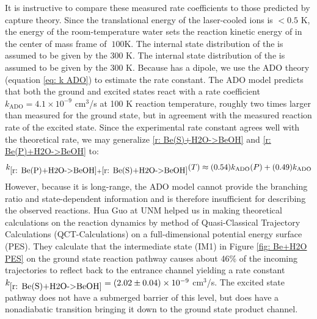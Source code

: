 It is instructive to compare these measured rate coefficients to those predicted by capture theory. Since the translational energy of the laser-cooled  ions is $<0.5$ K, the energy of the room-temperature water sets the reaction kinetic energy of  in the center of mass frame of $~100$K. The internal state distribution of the  is assumed to be given by the 300 K. The internal state distribution of the  is assumed to be given by the 300 K. Because  has a dipole, we use the ADO theory (equation \ref{eq: k ADO}) to estimate the rate constant. The ADO model predicts that both the ground and excited  states react with a rate coefficient $k_{\text{ADO}} = 4.1 \times 10^{-9}$ cm$^3$/s at 100 K reaction temperature, roughly two times larger than measured for the ground state, but in agreement with the measured reaction rate of the excited state. Since the experimental rate constant agrees well with the theoretical rate, we may generalize \ref{r: Be(S)+H2O->BeOH} and \ref{r: Be(P)+H2O->BeOH} to:
\begin{equation}
	k_{\ref{r: Be(P)+H2O->BeOH}+\ref{r: Be(S)+H2O->BeOH}}(T) \approx (0.54)k_{\mathrm{ADO}}(P) + (0.49)k_{\mathrm{ADO}}
	\label{eq: k Be+H2O(T)}
\end{equation}
However, because it is long-range, the ADO model cannot provide the branching ratio and state-dependent information and is therefore insufficient for describing the observed reactions. Hua Guo at UNM helped us in making theoretical calculations on the reaction dynamics by method of Quasi-Classical Trajectory Calculations (QCT-Calculations) on a full-dimensional potential energy surface (PES).\cite{Yang2018} They calculate that the intermediate state (IM1) in Figure \ref{fig: Be+H2O PES} on the ground state reaction pathway causes about 46\% of the incoming trajectories to reflect back to the entrance channel yielding a rate constant $k_{\ref{r: Be(S)+H2O->BeOH}} = (2.02 \pm 0.04) \times 10^{-9}$ cm$^3$/s. The excited state pathway does not have a submerged barrier of this level, but does have a nonadiabatic transition bringing it down to the ground state product channel.

